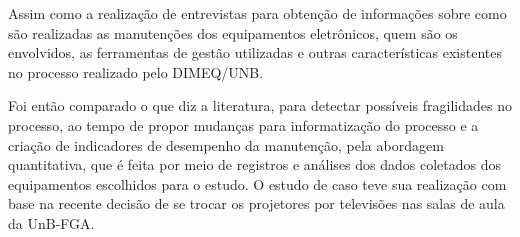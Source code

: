 Assim como a realização de entrevistas para obtenção de informações sobre como são realizadas as manutenções dos equipamentos eletrônicos, quem são os envolvidos, as ferramentas de gestão utilizadas e outras características existentes no processo realizado pelo DIMEQ/UNB.

Foi então comparado o que diz a literatura, para detectar possíveis fragilidades no processo, ao tempo de propor mudanças para informatização do processo e a criação de indicadores de desempenho da manutenção, pela abordagem quantitativa, que é feita por meio de registros e análises dos dados coletados dos equipamentos escolhidos para o estudo. O estudo de caso teve sua realização com base na recente decisão de se trocar os projetores por televisões nas salas de aula da UnB-FGA. 



